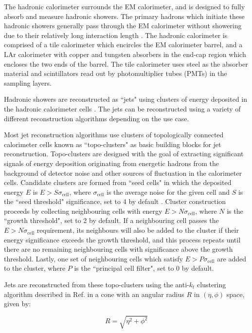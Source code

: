 The hadronic calorimeter surrounds the EM calorimeter, and is designed to fully absorb and measure hadronic showers. The primary hadrons which initiate these hadronic showers generally pass through the EM calorimeter without showering due to their relatively long interaction length \cite{atlas}. The hadronic calorimeter is comprised of a tile calorimeter which encircles the EM calorimeter barrel, and a LAr calorimeter with copper and tungsten absorbers in the end-cap region which encloses the two ends of the barrel. The tile calorimeter uses steel as the absorber material and scintillators read out by photomultiplier tubes (PMTs) in the sampling layers. 

Hadronic showers are reconstructed as ``jets" using clusters of energy deposited in the hadronic calorimeter cells \cite{jet_reco}. The jets can be reconstructed using a variety of different reconstruction algorithms depending on the use case. 

Most jet reconstruction algorithms use clusters of topologically connected calorimeter cells known as ``topo-clusters" as basic building blocks for jet reconstruction. Topo-clusters are designed with the goal of extracting significant signals of energy deposition originating from energetic hadrons from the background of detector noise and other sources of fluctuation in the calorimeter cells. Candidate clusters are formed from ``seed cells" in which the deposited energy $E$ is $E>S\sigma_\text{cell}$, where $\sigma_\text{cell}$ is the average noise for the given cell and $S$ is the ``seed threshold" significance, set to 4 by default \cite{topo_cell_clustering}. Cluster construction proceeds by collecting neighbouring cells with energy $E>N\sigma_\text{cell}$, where $N$ is the ``growth threshold", set to 2 by default. If a neighbouring cell passes the $E>N\sigma_\text{cell}$ requirement, its neighbours will also be added to the cluster if their energy significance exceeds the growth threshold, and this process repeats until there are no remaining neighbouring cells with significance above the growth threshold. Lastly, one set of neighbouring cells which satisfy $E>P\sigma_\text{cell}$ are added to the cluster, where $P$ is the ``principal cell filter", set to 0 by default.

Jets are reconstructed from these topo-clusters using the anti-$k_t$ clustering algorithm described in Ref. \cite{akt_algo} in a cone with an angular radius $R$ in $(\eta, \phi)$ space, given by:

\begin{equation}
\label{eq:jet_radius}
R = \sqrt{\eta^2 + \phi^2}
\end{equation}

